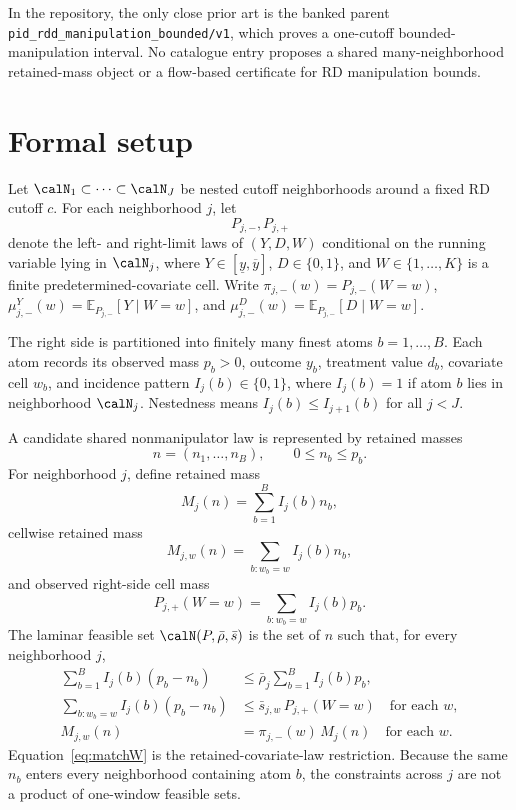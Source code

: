 \documentclass[11pt]{article}
\newcommand{\E}{\mathbb{E}}
\theoremstyle{definition}
\theoremstyle{plain}
\theoremstyle{remark}
\begin{document}
In the repository, the only close prior art is the banked parent
\texttt{pid\_rdd\_manipulation\_bounded/v1}, which proves a one-cutoff bounded-manipulation
interval.  No catalogue entry proposes a shared many-neighborhood retained-mass object or a
flow-based certificate for RD manipulation bounds.

\section{Formal setup}
Let \(\calN_1\subset\cdots\subset\calN_J\) be nested cutoff neighborhoods around a fixed RD
cutoff \(c\).  For each neighborhood \(j\), let
\[
  P_{j,-},P_{j,+}
\]
denote the left- and right-limit laws of \((Y,D,W)\) conditional on the running variable lying
in \(\calN_j\), where \(Y\in[\underline y,\overline y]\), \(D\in\{0,1\}\), and
\(W\in\{1,\ldots,K\}\) is a finite predetermined-covariate cell.  Write
\(\pi_{j,-}(w)=P_{j,-}(W=w)\), \(\mu_{j,-}^Y(w)=\E_{P_{j,-}}[Y\mid W=w]\), and
\(\mu_{j,-}^D(w)=\E_{P_{j,-}}[D\mid W=w]\).

The right side is partitioned into finitely many finest atoms \(b=1,\ldots,B\).  Each atom
records its observed mass \(p_b>0\), outcome \(y_b\), treatment value \(d_b\), covariate cell
\(w_b\), and incidence pattern \(I_j(b)\in\{0,1\}\), where \(I_j(b)=1\) if atom \(b\) lies in
neighborhood \(\calN_j\).  Nestedness means \(I_j(b)\le I_{j+1}(b)\) for all \(j<J\).

A candidate shared nonmanipulator law is represented by retained masses
\[
  n=(n_1,\ldots,n_B),\qquad 0\le n_b\le p_b.
\]
For neighborhood \(j\), define retained mass
\[
  M_j(n)=\sum_{b=1}^B I_j(b)n_b,
\]
cellwise retained mass
\[
  M_{j,w}(n)=\sum_{b:w_b=w} I_j(b)n_b,
\]
and observed right-side cell mass
\[
  P_{j,+}(W=w)=\sum_{b:w_b=w} I_j(b)p_b.
\]
The laminar feasible set \(\calN(P,\bar\rho,\bar s)\) is the set of \(n\) such that, for every
neighborhood \(j\),
\begin{align}
  \sum_{b=1}^B I_j(b)(p_b-n_b) &\le \bar\rho_j \sum_{b=1}^B I_j(b)p_b, \label{eq:global-budget}\\
  \sum_{b:w_b=w} I_j(b)(p_b-n_b) &\le \bar s_{j,w}\, P_{j,+}(W=w)
  \quad\text{for each }w, \label{eq:cell-budget}\\
  M_{j,w}(n) &= \pi_{j,-}(w)\, M_j(n) \quad\text{for each }w. \label{eq:matchW}
\end{align}
Equation~\eqref{eq:matchW} is the retained-covariate-law restriction.  Because the same \(n_b\)
enters every neighborhood containing atom \(b\), the constraints across \(j\) are not a product
of one-window feasible sets.
\end{document}
